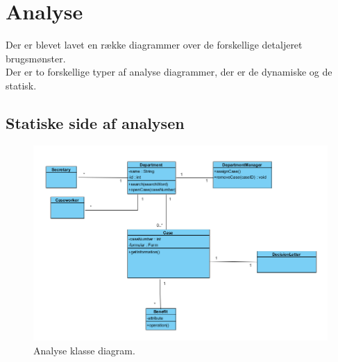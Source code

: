 \section{Analyse}
Der er blevet lavet en række diagrammer over de forskellige detaljeret brugsmønster.\\
Der er to forskellige typer af analyse diagrammer, der er de dynamiske og de statisk.

\subsection{Statiske side af analysen}
\begin{figure}
  \includegraphics[width=\linewidth]{./PNG/analyseKlasseDiagram.PNG} 
  \caption{Analyse klasse diagram.}
  \label{fig:AKlasse}
\end{figure}

